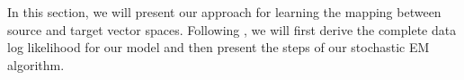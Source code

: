 In this section, we will present our approach for learning the mapping between source and target vector spaces. Following \cite{mimno2012topic}, we will first derive the complete data log likelihood for our model and then present the steps of our stochastic EM algorithm.


 